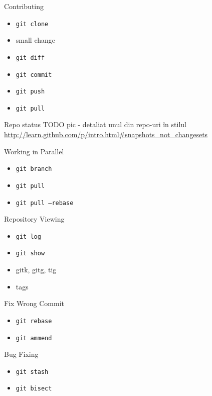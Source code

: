 \documentclass{beamer}
\begin{document}
\begin{frame}{Contributing}
  \begin{itemize}
    \item \texttt{git clone}
    \item small change
    \item \texttt{git diff}
    \item \texttt{git commit}
    \item \texttt{git push}
    \item \texttt{git pull}
  \end{itemize}
\end{frame}

\begin{frame}{Repo status}
TODO pic - detaliat unul din repo-uri în stilul
\url{http://learn.github.com/p/intro.html\#snapshots\_not\_changesets}
\end{frame}

\begin{frame}{Working in Parallel}
  \begin{itemize}
    \item \texttt{git branch}
    \item \texttt{git pull}
    \item \texttt{git pull --rebase}
  \end{itemize}
\end{frame}

\begin{frame}{Repository Viewing}
  \begin{itemize}
    \item \texttt{git log}
    \item \texttt{git show}
    \item gitk, gitg, tig
    \item tags
  \end{itemize}
\end{frame}

\begin{frame}{Fix Wrong Commit}
  \begin{itemize}
    \item \texttt{git rebase}
    \item \texttt{git ammend}
  \end{itemize}
\end{frame}

\begin{frame}{Bug Fixing}
  \begin{itemize}
    \item \texttt{git stash}
    \item \texttt{git bisect}
  \end{itemize}
\end{frame}
\end{document}

